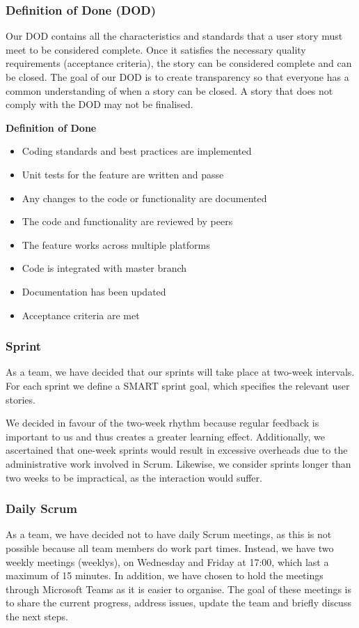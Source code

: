 \subsubsection{Definition of Done (DOD)}
Our DOD  contains all the characteristics and standards that a user story must meet to be considered complete.
Once it satisfies the necessary quality requirements (acceptance criteria), the story can be considered complete and can be closed.
The goal of our DOD is to create transparency so that everyone has a common understanding of when a story can be closed.
A story that does not comply with the DOD may not be finalised.

\textbf{Definition of Done}
\begin{itemize}
    \item Coding standards and best practices are implemented
    \item Unit tests for the feature are written and passe
    \item Any changes to the code or functionality are documented
    \item The code and functionality are reviewed by peers
    \item The feature works across multiple platforms
    \item Code is integrated with master branch
    \item Documentation has been updated
    \item Acceptance criteria are met
\end{itemize}

\subsubsection{Sprint}
As a team, we have decided that our sprints will take place at two-week intervals.
For each sprint we define a SMART sprint goal, which specifies the relevant user stories.

We decided in favour of the two-week rhythm because regular feedback is important to us and thus creates a greater learning effect.
Additionally, we ascertained that one-week sprints would result in excessive overheads due to the administrative work involved in Scrum.
Likewise, we consider sprints longer than two weeks to be impractical, as the interaction would suffer.

\subsubsection{Daily Scrum}
As a team, we have decided not to have daily Scrum meetings, as this is not possible because all team members do work part times. Instead, we have two weekly meetings (weeklys), on Wednesday and Friday at 17:00, which last a maximum of 15 minutes.
In addition, we have chosen to hold the meetings through Microsoft Teams as it is easier to organise.
The goal of these meetings is to share the current progress, address issues, update the team and briefly discuss the next steps.